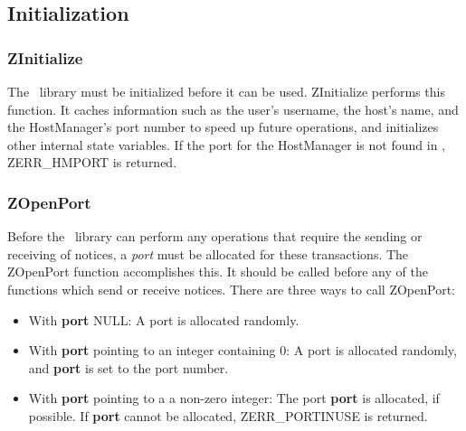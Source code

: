 %
\subsection{Initialization}
\label{initialization}

\subsubsection{ZInitialize}
\label{ZInitialize}

\etemplate
{}

The \Zephyr\ library must be initialized before it can be used.
ZInitialize performs this function.  It caches information such as the
user's username, the host's name, and the HostManager's port number to
speed up future operations, and initializes other internal state
variables.  If the port for the HostManager is not found in
, ZERR_HMPORT is returned.

\subsubsection{ZOpenPort}
\label{ZOpenPort}

\etemplate
{}

Before the \Zephyr\ library can perform any operations that require
the sending or receiving of notices, a {\em port\/} must be allocated
for these transactions.  The ZOpenPort function accomplishes this.  It
should be called before any of the functions which send or receive
notices.  There are three ways to call ZOpenPort:

\begin{itemize}
\item{With {\bf port} NULL:}
A port is allocated randomly.
\item{With {\bf port} pointing to an integer containing 0:}
A port is allocated randomly, and {\bf *port} is set to the port
number.
\item{With {\bf port} pointing to a a non-zero integer:}
The port {\bf *port} is allocated, if possible.  If {\bf *port} cannot
be allocated, ZERR_PORTINUSE is returned.
\end{itemize}
